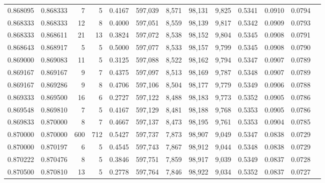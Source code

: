 \begin{tabular}{rrrrrrrrrrrrr}
0.868095 & 0.868333 &     7 &   5 &                                     0.4167 & 597,039 &   8,571 &  98,131 &   9,825 & 0.5341 & 0.0910 & 0.0794 \\
0.868333 & 0.868333 &    12 &   8 &                                     0.4000 & 597,051 &   8,559 &  98,139 &   9,817 & 0.5342 & 0.0909 & 0.0793 \\
0.868333 & 0.868611 &    21 &  13 &                                     0.3824 & 597,072 &   8,538 &  98,152 &   9,804 & 0.5345 & 0.0908 & 0.0791 \\
0.868643 & 0.868917 &     5 &   5 &                                     0.5000 & 597,077 &   8,533 &  98,157 &   9,799 & 0.5345 & 0.0908 & 0.0790 \\
0.869000 & 0.869083 &    11 &   5 &                                     0.3125 & 597,088 &   8,522 &  98,162 &   9,794 & 0.5347 & 0.0907 & 0.0789 \\
0.869167 & 0.869167 &     9 &   7 &                                     0.4375 & 597,097 &   8,513 &  98,169 &   9,787 & 0.5348 & 0.0907 & 0.0789 \\
0.869167 & 0.869286 &     9 &   8 &                                     0.4706 & 597,106 &   8,504 &  98,177 &   9,779 & 0.5349 & 0.0906 & 0.0788 \\
0.869333 & 0.869500 &    16 &   6 &                                     0.2727 & 597,122 &   8,488 &  98,183 &   9,773 & 0.5352 & 0.0905 & 0.0786 \\
0.869548 & 0.869810 &     7 &   5 &                                     0.4167 & 597,129 &   8,481 &  98,188 &   9,768 & 0.5353 & 0.0905 & 0.0786 \\
0.869833 & 0.870000 &     8 &   7 &                                     0.4667 & 597,137 &   8,473 &  98,195 &   9,761 & 0.5353 & 0.0904 & 0.0785 \\
0.870000 & 0.870000 &   600 & 712 &                                     0.5427 & 597,737 &   7,873 &  98,907 &   9,049 & 0.5347 & 0.0838 & 0.0729 \\
0.870000 & 0.870197 &     6 &   5 &                                     0.4545 & 597,743 &   7,867 &  98,912 &   9,044 & 0.5348 & 0.0838 & 0.0729 \\
0.870222 & 0.870476 &     8 &   5 &                                     0.3846 & 597,751 &   7,859 &  98,917 &   9,039 & 0.5349 & 0.0837 & 0.0728 \\
0.870500 & 0.870810 &    13 &   5 &                                     0.2778 & 597,764 &   7,846 &  98,922 &   9,034 & 0.5352 & 0.0837 & 0.0727 \\

\end{tabular}
